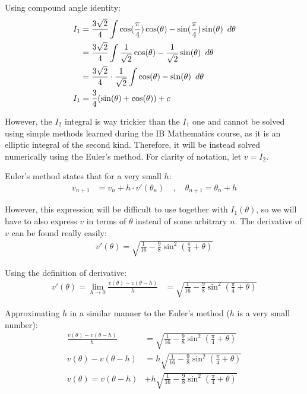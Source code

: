 \documentclass[12pt]{article}
\newcommand{\Hquad}{\hspace{0.5em}}
\begin{document}
        Using compound angle identity:
        \begin{align}
            I_1 &= \frac{3\sqrt{2}}{4} \int \cos (\frac{\pi}{4}) \cos(\theta) - \sin(\frac{\pi}{4}) \sin(\theta) \Hquad d\theta \\
            &= \frac{3\sqrt{2}}{4} \int \frac{1}{\sqrt{2}} \cos(\theta) - \frac{1}{\sqrt{2}} \sin(\theta) \Hquad d\theta \\
            &= \frac{3\sqrt{2}}{4} \cdot \frac{1}{\sqrt{2}} \int \cos(\theta) - \sin(\theta) \Hquad d\theta \\
            I_1 &= \frac{3}{4} (\sin(\theta) + \cos(\theta)) + c
        \end{align}

        However, the $I_2$ integral is way trickier than the $I_1$ one and cannot be solved using simple methods learned during the IB Mathematics course, as it is an elliptic integral of the second kind\cite{elliptic_integral}. Therefore, it will be instead solved numerically using the Euler's method. For clarity of notation, let $v = I_2$.

        Euler's method states that for a very small $h$:
        \begin{align}
            v_{n+1} &= v_n + h \cdot v'(\theta_n) \quad , \quad
            \theta_{n+1} = \theta_n +h
        \end{align}

        However, this expression will be difficult to use together with $I_1(\theta)$, so we will have to also express $v$ in terms of $\theta$ instead of some arbitrary $n$. The derivative of $v$ can be found really easily:
        \begin{align}
            v'(\theta) = \sqrt{\frac{1}{16} - \frac{9}{8} \sin^2 (\frac{\pi}{4}+\theta)}
        \end{align}

        Using the definition of derivative:
        \begin{align}
            v'(\theta) = \lim\limits_{h \to 0} \frac{v(\theta)-v(\theta-h)}{h} &= \sqrt{\frac{1}{16} - \frac{9}{8} \sin^2 (\frac{\pi}{4}+\theta)}
        \end{align}

        Approximating $h$ in a similar manner to the Euler's method ($h$ is a very small number):
        \begin{align}
            \frac{v(\theta)-v(\theta-h)}{h} &= \sqrt{\frac{1}{16} - \frac{9}{8} \sin^2 (\frac{\pi}{4}+\theta)} \\
            v(\theta)-v(\theta-h) &= h \sqrt{\frac{1}{16} - \frac{9}{8} \sin^2 (\frac{\pi}{4}+\theta)} \\
            v(\theta) = v(\theta-h) &+ h \sqrt{\frac{1}{16} - \frac{9}{8} \sin^2 (\frac{\pi}{4}+\theta)}
        \end{align}
\end{document}
